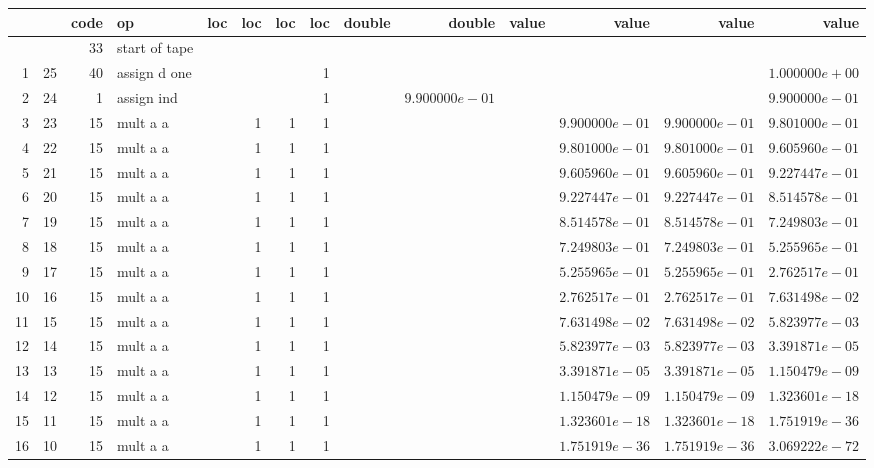 \documentclass{article}
\begin{document}
\tiny
\begin{tabular}{|r|r|r|l|r|r|r|r||r|r||r|r|r|r|} \hline 
 & & code & op & loc & loc & loc & loc & double & double & value & value & value & value \\ \hline 
 & & 33 & start of tape & & & & & & & & & &  \\ \hline 
1 & 25 & 40 & assign d one & & & & 1 & & & & & &$ 1.000000e+00 $\\ \hline 
2 & 24 & 1 & assign ind & & & & 1 & &$ 9.900000e-01 $& & & &$ 9.900000e-01 $\\ \hline 
3 & 23 & 15 & mult a a & & 1 & 1 & 1 & & & &$ 9.900000e-01 $&$ 9.900000e-01 $&$ 9.801000e-01 $\\ \hline 
4 & 22 & 15 & mult a a & & 1 & 1 & 1 & & & &$ 9.801000e-01 $&$ 9.801000e-01 $&$ 9.605960e-01 $\\ \hline 
5 & 21 & 15 & mult a a & & 1 & 1 & 1 & & & &$ 9.605960e-01 $&$ 9.605960e-01 $&$ 9.227447e-01 $\\ \hline 
6 & 20 & 15 & mult a a & & 1 & 1 & 1 & & & &$ 9.227447e-01 $&$ 9.227447e-01 $&$ 8.514578e-01 $\\ \hline 
7 & 19 & 15 & mult a a & & 1 & 1 & 1 & & & &$ 8.514578e-01 $&$ 8.514578e-01 $&$ 7.249803e-01 $\\ \hline 
8 & 18 & 15 & mult a a & & 1 & 1 & 1 & & & &$ 7.249803e-01 $&$ 7.249803e-01 $&$ 5.255965e-01 $\\ \hline 
9 & 17 & 15 & mult a a & & 1 & 1 & 1 & & & &$ 5.255965e-01 $&$ 5.255965e-01 $&$ 2.762517e-01 $\\ \hline 
10 & 16 & 15 & mult a a & & 1 & 1 & 1 & & & &$ 2.762517e-01 $&$ 2.762517e-01 $&$ 7.631498e-02 $\\ \hline 
11 & 15 & 15 & mult a a & & 1 & 1 & 1 & & & &$ 7.631498e-02 $&$ 7.631498e-02 $&$ 5.823977e-03 $\\ \hline 
12 & 14 & 15 & mult a a & & 1 & 1 & 1 & & & &$ 5.823977e-03 $&$ 5.823977e-03 $&$ 3.391871e-05 $\\ \hline 
13 & 13 & 15 & mult a a & & 1 & 1 & 1 & & & &$ 3.391871e-05 $&$ 3.391871e-05 $&$ 1.150479e-09 $\\ \hline 
14 & 12 & 15 & mult a a & & 1 & 1 & 1 & & & &$ 1.150479e-09 $&$ 1.150479e-09 $&$ 1.323601e-18 $\\ \hline 
15 & 11 & 15 & mult a a & & 1 & 1 & 1 & & & &$ 1.323601e-18 $&$ 1.323601e-18 $&$ 1.751919e-36 $\\ \hline 
16 & 10 & 15 & mult a a & & 1 & 1 & 1 & & & &$ 1.751919e-36 $&$ 1.751919e-36 $&$ 3.069222e-72 $\\ \hline 

\end{tabular}
\end{document}
